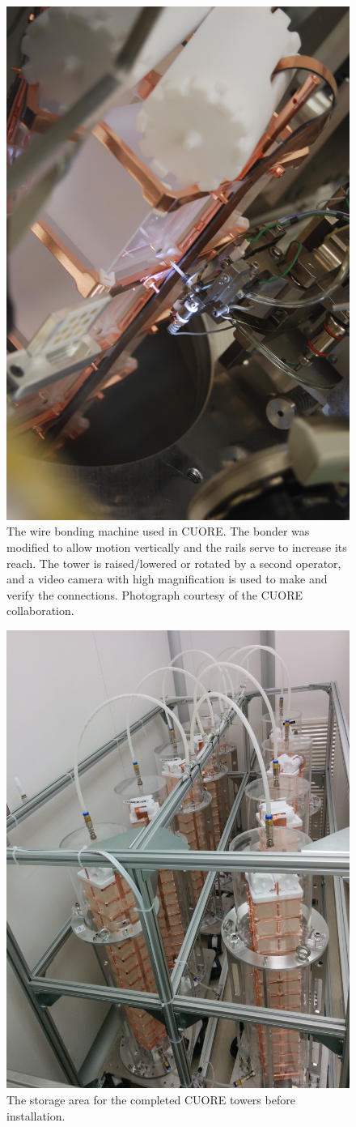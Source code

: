 \begin{figure}[htbp]
    \centering
    \includegraphics[width=0.6\linewidth, angle=270, origin=c]{Figures/bonding_machine.jpg}
    \caption[The wire bonding machine used in CUORE.]
    {The wire bonding machine used in CUORE.
    The bonder was modified to allow motion vertically and the rails serve to increase its reach.
    The tower is raised/lowered or rotated by a second operator, and a video camera with high magnification is used to make and verify the connections.
    Photograph courtesy of the CUORE collaboration.}
    \label{fig:bonding_machine}
\end{figure}

\begin{figure}[htbp]
    \centering
    \includegraphics[width=0.5\linewidth]{Figures/cuore_towers_pic1.jpg}
    \caption[The storage area for the completed CUORE towers before installation.]
    {The storage area for the completed CUORE towers before installation.}
    \label{fig:tower_storage}
\end{figure}

